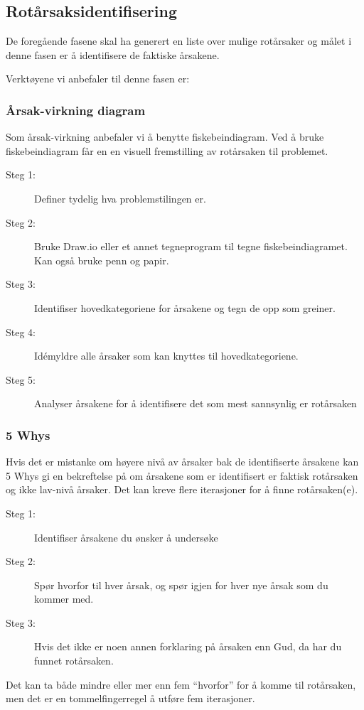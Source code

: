 \subsection{Rotårsaksidentifisering}
De foregående fasene skal ha generert en liste over mulige rotårsaker og målet i denne fasen er å identifisere de faktiske årsakene. 

Verktøyene vi anbefaler til denne fasen er:

\subsubsection{Årsak-virkning diagram} Som årsak-virkning anbefaler vi å benytte fiskebeindiagram. Ved å bruke fiskebeindiagram får en en visuell fremstilling av rotårsaken til problemet.
    \begin{description}
        \item[Steg 1:] Definer tydelig hva problemstilingen er.
        \item[Steg 2:] Bruke Draw.io eller et annet tegneprogram til tegne fiskebeindiagramet. Kan også bruke penn og papir. 
        \item[Steg 3:] Identifiser hovedkategoriene for årsakene og tegn de opp som greiner.
        \item[Steg 4:] Idémyldre alle årsaker som kan knyttes til hovedkategoriene.
        \item[Steg 5:] Analyser årsakene for å identifisere det som mest sannsynlig er rotårsaken
    \end{description}
    
\subsubsection{5 Whys} 
Hvis det er mistanke om høyere nivå av årsaker bak de identifiserte årsakene kan 5 Whys gi en bekreftelse på om årsakene som er identifisert er faktisk rotårsaken og ikke lav-nivå årsaker. Det kan kreve flere iterasjoner for å finne rotårsaken(e).  
    \begin{description}
        \item[Steg 1:] Identifiser årsakene du ønsker å undersøke
        \item[Steg 2:] Spør hvorfor til hver årsak, og spør igjen for hver nye årsak som du kommer med.
        \item[Steg 3:] Hvis det ikke er noen annen forklaring på årsaken enn Gud, da har du funnet rotårsaken.
    \end{description}
Det kan ta både mindre eller mer enn fem ``hvorfor'' for å komme til rotårsaken, men det er en tommelfingerregel å utføre fem iterasjoner. 
    
